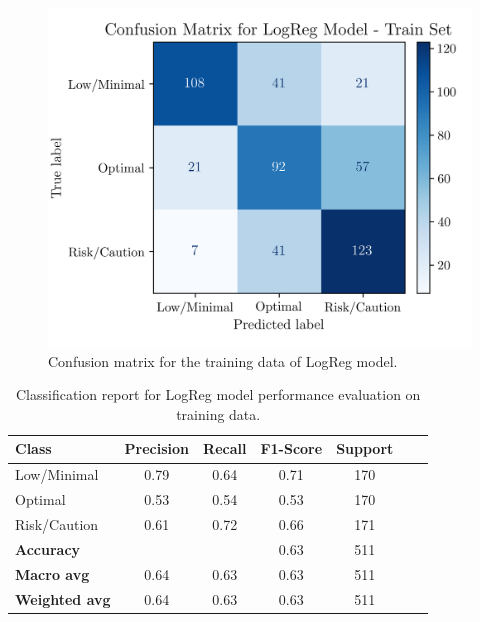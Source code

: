 \documentclass[conference]{IEEEtran}
\begin{document}
\begin{figure}[H]
    \centering
    \includegraphics[width=1\linewidth]{assets/LOGR_confmatTrain.png}
    \caption{Confusion matrix for the training data of LogReg model.}
    \label{cf_train_LogReg}
\end{figure} %

\begin{table}[H]
\centering
\caption{Classification report for LogReg model performance evaluation on training data.}
\label{crTrainLogReg}
\begin{tabular}{lcccccc}
\toprule
\textbf{Class} & \textbf{Precision} & \textbf{Recall} & \textbf{F1-Score} & \textbf{Support} \\
\midrule
Low/Minimal & 0.79 & 0.64 & 0.71 & 170 \\
Optimal & 0.53 & 0.54 & 0.53 & 170 \\
Risk/Caution & 0.61 & 0.72 & 0.66 & 171 \\
\midrule
\textbf{Accuracy} &  &  & 0.63 & 511 \\
\textbf{Macro avg} & 0.64 & 0.63 & 0.63 & 511 \\
\textbf{Weighted avg} & 0.64 & 0.63 & 0.63 & 511 \\
\bottomrule
\end{tabular}
\end{table} %
\end{document}
